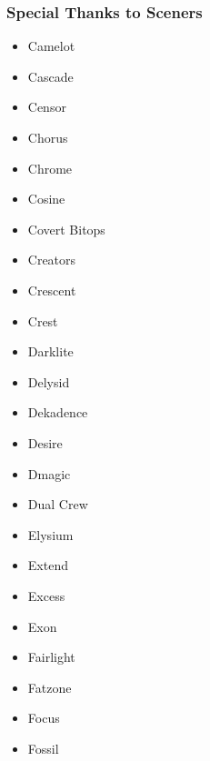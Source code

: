 \begin{frame}
\frametitle{Special Thanks to Sceners}

\begin{multicols}{3}
\begin{itemize}
\item Camelot
\item Cascade
\item Censor
\item Chorus
\item Chrome
\item Cosine
\item Covert Bitops
\item Creators
\item Crescent
\item Crest
\item Darklite
\item Delysid
\item Dekadence
\item Desire
\item Dmagic
\item Dual Crew
\item Elysium
\item Extend
\item Excess
\item Exon
\item Fairlight
\item Fatzone
\item Focus
\item Fossil
\end{itemize}
\end{multicols}

\end{frame}


